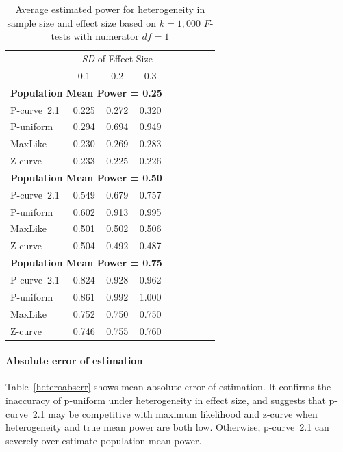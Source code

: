 \documentclass[jou]{apa6} %
\begin{document}
\begin{table}[h]
\caption{Average estimated power for heterogeneity in sample size and effect size based on $k=1,000$ $F$-tests with numerator $df=1$}
{\small
\begin{center}
\begin{tabular}{lccc c lccc}  \hline
      & \multicolumn{3}{c}{\emph{SD} of Effect Size} \\ 
          &  0.1  &  0.2  &  0.3    \\ \hline
\multicolumn{4}{l}{\textbf{Population Mean Power = 0.25}} \\ \hline
P-curve~2.1   & 0.225 & 0.272 & 0.320    \\
P-uniform & 0.294 & 0.694 & 0.949    \\
MaxLike   & 0.230 & 0.269 & 0.283    \\
Z-curve   & 0.233 & 0.225 & 0.226    \\ \hline
\multicolumn{4}{l}{\textbf{Population Mean Power = 0.50}} \\ \hline
P-curve~2.1   & 0.549 & 0.679 & 0.757    \\
P-uniform & 0.602 & 0.913 & 0.995   \\
MaxLike   & 0.501 & 0.502 & 0.506    \\
Z-curve   & 0.504 & 0.492 & 0.487   \\ \hline
\multicolumn{4}{l}{\textbf{Population Mean Power = 0.75}} \\ \hline
P-curve~2.1   & 0.824 & 0.928 & 0.962   \\
P-uniform & 0.861 & 0.992 & 1.000    \\
MaxLike   & 0.752 & 0.750 & 0.750    \\
Z-curve   & 0.746 & 0.755 & 0.760   \\ \hline
\end{tabular}
\end{center}
} %
\label{heteromean}  %
\end{table}

\paragraph{Absolute error of estimation}
Table~\ref{heteroabserr} shows mean absolute error of estimation. It confirms the inaccuracy of p-uniform under heterogeneity in effect size, and suggests that p-curve~2.1 may be competitive with maximum likelihood and z-curve when heterogeneity and true mean power are both low. Otherwise, p-curve~2.1 can severely over-estimate population mean power. 
\end{document}
